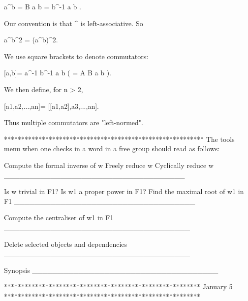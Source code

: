 a^b = B a b  = b^-1 a b .

Our convention is that ^ is left-associative. So

a^b^2 = (a^b)^2.

We use square brackets to denote commutators:

[a,b]= a^-1 b^-1 a b ( = A B a b ).

We then define, for n > 2, 

[a1,a2,...,an]= [[a1,a2],a3,...,an].

Thus multiple commutators are "left-normed".

**********************************************************
The tools menu when one checks in a word in a free
group should read as follows:

Compute the formal inverse of w
Freely reduce w
Cyclically reduce w
___________________________________

Is w trivial in F1?
Is w1 a proper power in F1?
Find the maximal root of w1 in F1
___________________________________

Compute the centraliser of w1 in F1
____________________________________

Delete selected objects and dependencies
____________________________________

Synopsis
____________________________________

*********************************************************
January 5
*********************************************************

